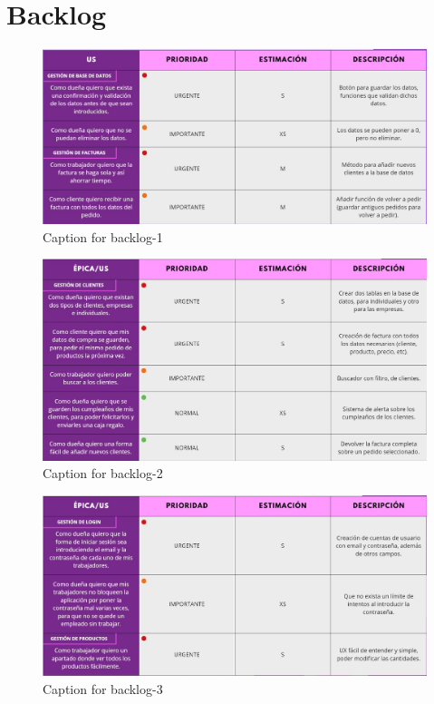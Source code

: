 \chapter{Backlog}

\begin{figure}[h]
    \centering
    \includegraphics[width=1\textwidth]{figures/backlog-1.jpeg}
    \caption{Caption for backlog-1}
    \label{fig:backlog1}
\end{figure}

\begin{figure}[h]
    \centering
    \includegraphics[width=1\textwidth]{figures/backlog-2.jpeg}
    \caption{Caption for backlog-2}
    \label{fig:backlog2}
\end{figure}

\begin{figure}[h]
    \centering
    \includegraphics[width=1\textwidth]{figures/backlog-3.jpeg}
    \caption{Caption for backlog-3}
    \label{fig:backlog3}
\end{figure}

